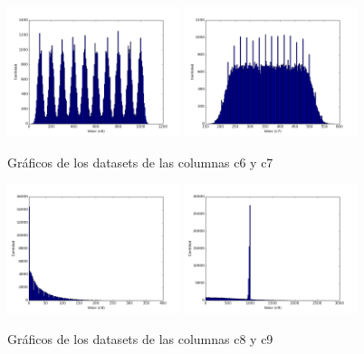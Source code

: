  
\begin{figure}[h!]
  \centering
  \includegraphics[width=0.45\textwidth]{./../source/datasets/img/c6}
  \includegraphics[width=0.45\textwidth]{./../source/datasets/img/c7}
  \caption{Gráficos de los datasets de las columnas c6 y c7}
 \end{figure}
 
 
\begin{figure}[h!]
  \centering
  \includegraphics[width=0.45\textwidth]{./../source/datasets/img/c8}
  \includegraphics[width=0.45\textwidth]{./../source/datasets/img/c9}
  \caption{Gráficos de los datasets de las columnas c8 y c9}
 \end{figure}
 
